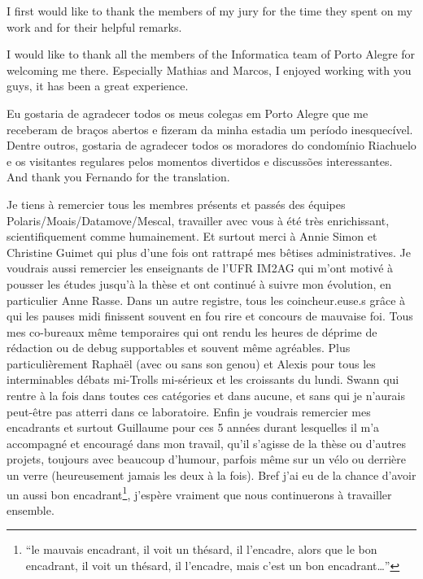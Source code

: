 
I first would like to thank the members of my jury for the time they spent on my work and for their helpful remarks.

I would like to thank all the members of the Informatica team of Porto Alegre for welcoming me there.
Especially Mathias and Marcos, I enjoyed working with you guys, it has been a great experience.

Eu gostaria de agradecer todos os meus colegas em Porto Alegre que me receberam de braços abertos e fizeram da minha estadia um período inesquecível.
Dentre outros, gostaria de agradecer todos os moradores do condomínio Riachuelo e os visitantes regulares pelos momentos divertidos e discussões interessantes.
And thank you Fernando for the translation.

Je tiens à remercier tous les membres présents et passés des équipes Polaris/Moais/Datamove/Mescal, travailler avec vous à été très enrichissant, scientifiquement comme humainement.
Et surtout merci à Annie Simon et Christine Guimet qui plus d'une fois ont rattrapé mes bêtises administratives.
Je voudrais aussi remercier les enseignants de l'UFR IM2AG qui m'ont motivé à pousser les études jusqu'à la thèse et ont continué à suivre mon évolution, en particulier Anne Rasse.
Dans un autre registre, tous les coincheur.euse.s grâce à qui les pauses midi finissent souvent en fou rire et concours de mauvaise foi.
Tous mes co-bureaux même temporaires qui ont rendu les heures de déprime de rédaction ou de debug supportables et souvent même agréables.
Plus particulièrement Raphaël (avec ou sans son genou) et Alexis pour tous les interminables débats mi-Trolls mi-sérieux et les croissants du lundi.
Swann qui rentre à la fois dans toutes ces catégories et dans aucune, et sans qui je n'aurais peut-être pas atterri dans ce laboratoire.
Enfin je voudrais remercier mes encadrants et surtout Guillaume pour ces 5 années durant lesquelles il m'a accompagné et encouragé dans mon travail, qu'il s'agisse de la thèse ou d'autres projets, toujours avec beaucoup d'humour, parfois même sur un vélo ou derrière un verre (heureusement jamais les deux à la fois).
Bref j'ai eu de la chance d'avoir un aussi bon encadrant\footnote{
    “le mauvais encadrant, il voit un thésard, il l'encadre, alors que le bon encadrant, il voit un thésard, il l'encadre, mais c'est un bon encadrant\ldots”
}, j'espère vraiment que nous continuerons à travailler ensemble.

